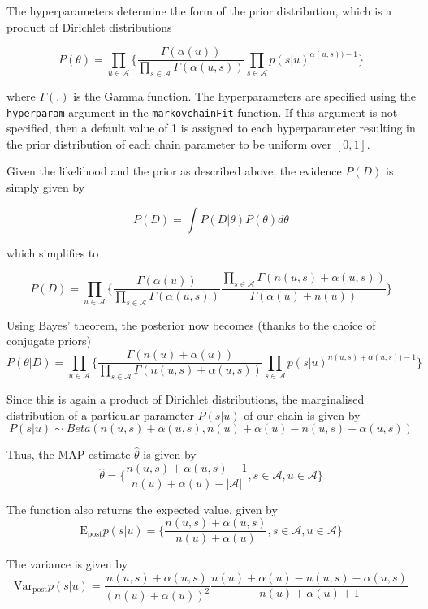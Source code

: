 \documentclass[
  nojss]{jss}
\begin{document}
The hyperparameters determine the form of the prior distribution, which is a product of Dirichlet distributions

\[P(\theta) = \prod_{u \in \mathcal{A}} \Big\{ \frac{\Gamma(\alpha(u))}{\prod_{s \in \mathcal{A}} \Gamma(\alpha(u, s))} \prod_{s \in \mathcal{A}} p(s|u)^{\alpha(u, s)) - 1} \Big\}\]

where \(\Gamma(.)\) is the Gamma function. The hyperparameters are specified using the \texttt{hyperparam} argument in the \texttt{markovchainFit} function. If this argument is not specified, then a default value of 1 is assigned to each hyperparameter resulting in the prior distribution of each chain parameter to be uniform over \([0,1]\).

Given the likelihood and the prior as described above, the evidence \(P(D)\) is simply given by

\[P(D) = \int P(D|\theta) P(\theta) d\theta\]

which simplifies to

\[
P(D) = \prod_{u \in \mathcal{A}} \Big\{ \frac{\Gamma(\alpha(u))}{\prod_{s \in \mathcal{A}} \Gamma(\alpha(u, s))} \frac{\prod_{s \in \mathcal{A}} \Gamma(n(u, s) + \alpha(u, s))}{\Gamma(\alpha(u) + n(u))} \Big\}
\]

Using Bayes' theorem, the posterior now becomes (thanks to the choice of conjugate priors)
\[
P(\theta | D) = \prod_{u \in \mathcal{A}} \Big\{ \frac{\Gamma(n(u) + \alpha(u))}{\prod_{s \in \mathcal{A}} \Gamma(n(u, s) + \alpha(u, s))} \prod_{s \in \mathcal{A}} p(s|u)^{n(u, s) + \alpha(u, s)) - 1} \Big\}
\]

Since this is again a product of Dirichlet distributions, the marginalised distribution of a particular parameter \(P(s|u)\) of our chain is given by
\[
P(s|u) \sim Beta(n(u, s) + \alpha(u, s), n(u) + \alpha(u) - n(u, s) - \alpha(u, s))
\]

Thus, the MAP estimate \(\hat{\theta}\) is given by
\[
\hat{\theta} = \Big\{ \frac{n(u, s) + \alpha(u, s) - 1}{n(u) + \alpha(u) - |\mathcal{A}|}, s \in \mathcal{A}, u \in \mathcal{A} \Big\}
\]

The function also returns the expected value, given by
\[
\text{E}_{\text{post}} p(s|u) = \Big\{ \frac{n(u, s) + \alpha(u, s)}{n(u) + \alpha(u)}, s \in \mathcal{A}, u \in \mathcal{A} \Big\}
\]

The variance is given by
\[
\text{Var}_{\text{post}} p(s|u) = \frac{n(u, s) + \alpha(u, s)}{(n(u) + \alpha(u))^2} \frac{n(u) + \alpha(u) - n(u, s) - \alpha(u, s)}{n(u) + \alpha(u) + 1}
\]
\end{document}
